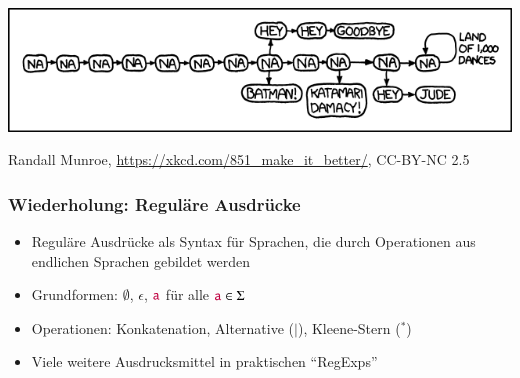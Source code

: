 \documentclass[aspectratio=1610,onlymath]{beamer}
\begin{document}
\maketitle

\begin{frame}\frametitle{}

\includegraphics[width=\linewidth]{images/xkcd-na_make_it_better}

{\tiny Randall Munroe, \url{https://xkcd.com/851_make_it_better/}, CC-BY-NC 2.5}

\end{frame}



\begin{frame}\frametitle{Wiederholung: Reguläre Ausdrücke}

\begin{itemize}
\item Reguläre Ausdrücke als Syntax für Sprachen, die durch Operationen aus endlichen Sprachen gebildet werden
\item Grundformen: $\emptyset$, $\epsilon$, $\mathtt{\textcolor{purple}{a}}$ für alle $\mathtt{\textcolor{purple}{a}}\in\Sigma$
\item Operationen: Konkatenation, Alternative ($\mid$), Kleene-Stern (${}^*$)
\item Viele weitere Ausdrucksmittel in praktischen "`RegExps"'
\end{itemize}

\end{frame}
\end{document}

